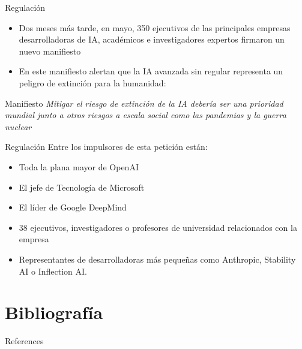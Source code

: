 \documentclass[11pt,aspectratio=169]{beamer}
\begin{document}
\begin{frame}{Regulación}
    \begin{itemize}
        \item Dos meses más tarde, en mayo, 350 ejecutivos de las principales empresas 
            desarrolladoras de IA, académicos e investigadores expertos firmaron un nuevo 
            manifiesto \pause
        \item En este manifiesto alertan que la IA avanzada sin regular representa un peligro de 
            extinción para la humanidad: \pause
    \end{itemize}
    \begin{block}{Manifiesto}
        \textit{Mitigar el riesgo de extinción de la IA debería ser una prioridad mundial junto a otros riesgos a escala social como las pandemias y la guerra nuclear}
    \end{block}
\end{frame}

\begin{frame}{Regulación}
    Entre los impulsores de esta petición están:
    \begin{itemize}
        \item Toda la plana mayor de OpenAI \pause
        \item El jefe de Tecnología de Microsoft \pause
        \item El líder de Google DeepMind \pause
        \item 38 ejecutivos, investigadores o profesores de universidad relacionados con la empresa\pause
        \item Representantes de desarrolladoras más pequeñas como Anthropic, Stability AI o Inflection AI.
    \end{itemize}
\end{frame}


\section{Bibliografía}
\begin{frame}[allowframebreaks]{References}
    \nocite{*}
    
    
\end{frame}
\end{document}

